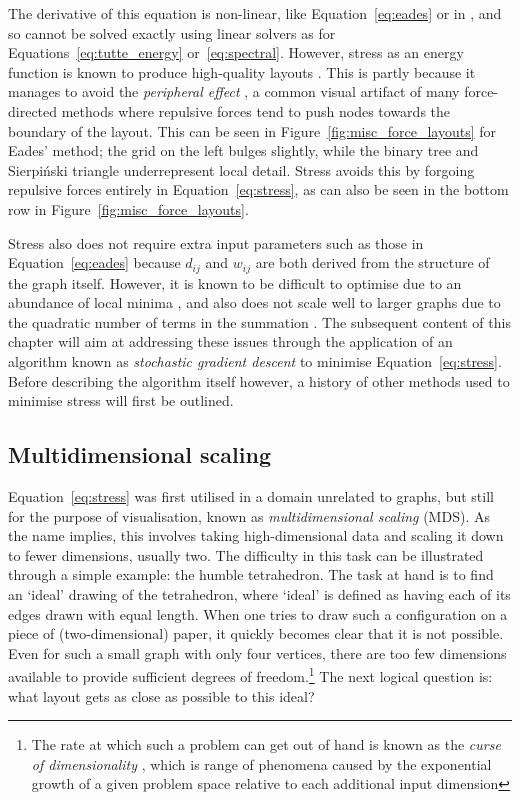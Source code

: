 The derivative of this equation is non-linear, like Equation~\eqref{eq:eades} or in \cite{Fruchterman1991, Frick1995}, and so cannot be solved exactly using linear solvers as for Equations~\eqref{eq:tutte_energy} or~\eqref{eq:spectral}.
However, stress as an energy function is known to produce high-quality layouts \cite{Brandes2008}. This is partly because it manages to avoid the \emph{peripheral effect} \cite{Hu2005}, a common visual artifact of many force-directed methods where repulsive forces tend to push nodes towards the boundary of the layout. This can be seen in Figure~\ref{fig:misc_force_layouts} for Eades' method; the grid on the left bulges slightly, while the binary tree and Sierpi\'nski triangle underrepresent local detail.
Stress avoids this by forgoing repulsive forces entirely in Equation~\eqref{eq:stress}, as can also be seen in the bottom row in Figure~\ref{fig:misc_force_layouts}.

Stress also does not require extra input parameters such as those in Equation~\eqref{eq:eades} because $d_{ij}$ and $w_{ij}$ are both derived from the structure of the graph itself.
However, it is known to be difficult to optimise due to an abundance of local minima \cite{DeLeeuw1988, Gansner2004}, and also does not scale well to larger graphs due to the quadratic number of terms in the summation \cite{Brandes2008, Hu2005}.
The subsequent content of this chapter will aim at addressing these issues through the application of an algorithm known as \emph{stochastic gradient descent} to minimise Equation~\eqref{eq:stress}. Before describing the algorithm itself however, a history of other methods used to minimise stress will first be outlined.

\subsection{Multidimensional scaling}
\label{sec:stress_background}
Equation~\eqref{eq:stress} was first utilised in a domain unrelated to graphs, but still for the purpose of visualisation, known as \emph{multidimensional scaling} (MDS). As the name implies, this involves taking high-dimensional data and scaling it down to fewer dimensions, usually two.
The difficulty in this task can be illustrated through a simple example: the humble tetrahedron. The task at hand is to find an `ideal' drawing of the tetrahedron, where `ideal' is defined as having each of its edges drawn with equal length. When one tries to draw such a configuration on a piece of (two-dimensional) paper, it quickly becomes clear that it is not possible.
Even for such a small graph with only four vertices, there are too few dimensions available to provide sufficient degrees of freedom.\footnote{The rate at which such a problem can get out of hand is known as the \emph{curse of dimensionality} \cite{Friedman2001Local}, which is range of phenomena caused by the exponential growth of a given problem space relative to each additional input dimension}
The next logical question is: what layout gets as close as possible to this ideal?

